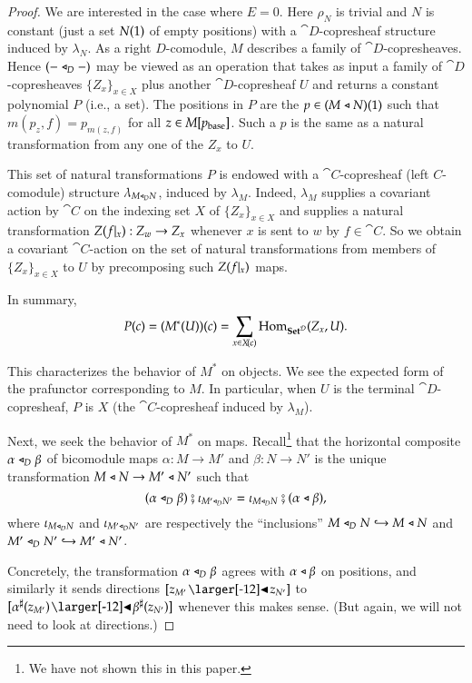 \documentclass{amsart}
\begin{document}
\begin{proof}
  We are interested in the case where $E = 0$. Here $\rho_N$ is
  trivial and $N$ is constant (just a set $N(1)$ of empty
  positions) with a $\cat{D}$-copresheaf structure induced by
  $\lambda_N$. As a right $D$-comodule, $M$ describes a family of
  $\cat{D}$-copresheaves. Hence $(- \mathrel{\triangleleft}_D -)$ may be viewed as an
  operation that takes as input a family of $\cat{D}$-copresheaves
  $\{Z_x\}_{x \in X}$ plus another $\cat{D}$-copresheaf $U$ and
  returns a constant polynomial $P$ (i.e., a set). The positions in
  $P$ are the $p \in (M \mathrel{\triangleleft} N)(1)$ such that
  $m(p_z, f) = p_{m(z, f)}$ for all $z \in M[p_{\mathrm{base}}]$. Such a $p$ is
  the same as a natural transformation from any one of the $Z_x$ to
  $U$.

  This set of natural transformations $P$ is endowed with a
  $\cat{C}$-copresheaf (left $C$-comodule) structure
  $\lambda_{M \mathrel{\triangleleft}_D N}$, induced by $\lambda_M$. Indeed, $\lambda_M$
  supplies a covariant action by $\cat{C}$ on the indexing set $X$ of
  $\{Z_x\}_{x \in X}$ and supplies a natural transformation
  $Z(f|_{x}): Z_w \to Z_x$ whenever $x$ is sent to $w$ by
  $f \in \cat{C}$. So we obtain a covariant $\cat{C}$-action on the
  set of natural transformations from members of $\{Z_x\}_{x \in X}$
  to $U$ by precomposing such $Z(f|_{x})$ maps.

  In summary,
  \[P(c) = (M^*(U))(c) = \sum_{x \in X\!(c)}\operatorname{Hom}_{{\normalfont\mathbf{Set}}^{\mathcal{D}}}(Z_x, U).\]

  This characterizes the behavior of $M^*$ on objects. We see the
  expected form of the prafunctor corresponding to $M$. In particular,
  when $U$ is the terminal $\cat{D}$-copresheaf, $P$ is $X$ (the
  $\cat{C}$-copresheaf induced by $\lambda_M$).
  
  Next, we seek the behavior of $M^*$ on maps. Recall\footnote{We have
    not shown this in this paper.} that the horizontal composite
  $\alpha \mathrel{\triangleleft}_D \beta$ of bicomodule maps $\alpha: M \to M'$ and
  $\beta: N \to N'$ is the unique transformation
  $M \mathrel{\triangleleft} N \to M' \mathrel{\triangleleft} N'$ such that
  \[(\alpha \mathrel{\triangleleft}_D \beta) \fatsemi \iota_{M' \mathrel{\triangleleft}_D N'} = \iota_{M
      \mathrel{\triangleleft}_D N} \fatsemi (\alpha \mathrel{\triangleleft} \beta),\] where
  $\iota_{M \mathrel{\triangleleft}_D N}$ and $\iota_{M' \mathrel{\triangleleft}_D N'}$ are respectively the
  ``inclusions'' ${M \mathrel{\triangleleft}_D N \hookrightarrow M \mathrel{\triangleleft} N}$ and
  ${M' \mathrel{\triangleleft}_D N' \hookrightarrow M' \mathrel{\triangleleft} N'}$.

  Concretely, the transformation $\alpha \mathrel{\triangleleft}_D \beta$ agrees with
  $\alpha \mathrel{\triangleleft} \beta$ on positions, and similarly it sends directions
  $[z_{M'} \subd z_{N'}]$ to
  $[\anydirmapof{\alpha}{z_{M'}} \subd \anydirmapof{\beta}{z_{N'}}]$
  whenever this makes sense. (But again, we will not need to look at
  directions.)


\end{proof}
\end{document}
